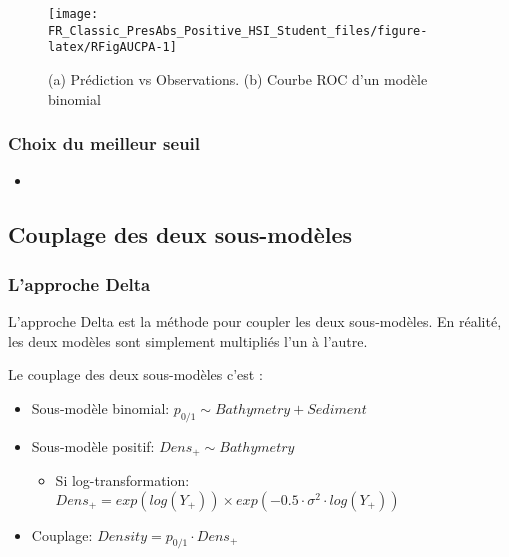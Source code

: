\documentclass[french,a4paper]{article}
\providecommand{\tightlist}{%
  \setlength{\itemsep}{0pt}\setlength{\parskip}{0pt}}
\begin{document}
\begin{figure}[!h]

{\centering \texttt{[image: FR\_Classic\_PresAbs\_Positive\_HSI\_Student\_files/figure-latex/RFigAUCPA-1]} 

}

\caption{(a) Prédiction vs Observations. (b) Courbe ROC d'un modèle binomial}\label{fig:RFigAUCPA}
\end{figure}

\hypertarget{choix-du-meilleur-seuil}{%
\subsubsection{Choix du meilleur seuil}\label{choix-du-meilleur-seuil}}

\begin{itemize}
\item
\end{itemize}

\hypertarget{couplage-des-deux-sous-modeles}{%
\subsection{Couplage des deux sous-modèles}\label{couplage-des-deux-sous-modeles}}

\hypertarget{lapproche-delta}{%
\subsubsection{L'approche Delta}\label{lapproche-delta}}

L'approche Delta est la méthode pour coupler les deux sous-modèles. En réalité, les deux modèles sont simplement multipliés l'un à l'autre.

Le couplage des deux sous-modèles c'est :

\begin{itemize}
\tightlist
\item
  Sous-modèle binomial: \(p_{0/1} \sim Bathymetry + Sediment\)
\item
  Sous-modèle positif: \(Dens_{+} \sim Bathymetry\)

  \begin{itemize}
  \tightlist
  \item
    Si log-transformation: \(Dens_{+} = exp(log(Y_{+})) \times exp(-0.5 \cdot \sigma^{2} \cdot log(Y_{+}))\)
  \end{itemize}
\item
  Couplage: \(Density = p_{0/1} \cdot Dens_{+}\)
\end{itemize}
\end{document}
